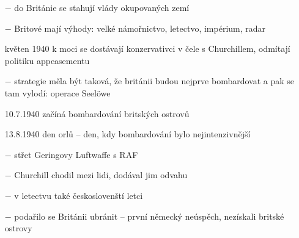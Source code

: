 \documentclass{article}
\begin{document}
\begin{itemize}
    \item[$-$] do Británie se stahují vlády okupovaných zemí
    \item[$-$] Britové mají výhody: velké námořnictvo, letectvo, impérium, radar
    \item[květen 1940] k moci se dostávají
    konzervativci v čele s Churchillem, odmítají politiku appeasementu
    \item[$-$] strategie měla být taková, že británii budou nejprve bombardovat a pak se tam vylodí: operace Seelöwe
    \item[10.7.1940] začíná bombardování britských ostrovů
    \item[13.8.1940] den orlů -- den, kdy bombardování bylo nejintenzivnější
    \item[$-$] střet Geringovy Luftwaffe s RAF
    \item[$-$] Churchill chodil mezi lidi, dodával jim odvahu
    \item[$-$] v letectvu také českoslovenští letci
    \item[$-$] podařilo se Británii ubránit -- první německý neúspěch, nezískali britské ostrovy
\end{itemize}
\end{document}
